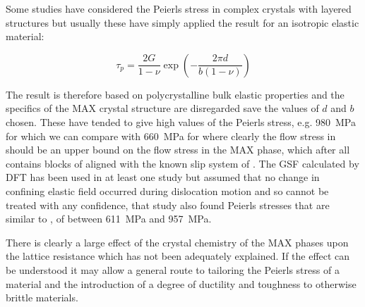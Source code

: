 Some studies have considered the Peierls stress in complex crystals with layered structures \cite{Music2008,Emmerlich2009,Gouriet2015} but usually these have simply applied the result for an isotropic elastic material:

\begin{equation}
\tau_p = \frac{2G}{1-\nu} \exp \left( - \frac{2 \pi d}{b(1-\nu)} \right)
\end{equation}

The result is therefore based on polycrystalline bulk elastic properties and the specifics of the MAX crystal structure are disregarded save the values of $d$ and $b$ chosen. These have tended to give high values of the Peierls stress, e.g. \SI{980}{\mega\pascal} for  \cite{Music2008} which we can compare with \SI{660}{\mega\pascal} for  \cite{Clegg2006} where clearly the flow stress in  should be an upper bound on the flow stress in the MAX phase, which after all contains blocks of  aligned with the known slip system of  \cite{Hollox1966}. The GSF calculated by DFT has been used in at least one study \cite{Gouriet2015} but assumed that no change in confining elastic field occurred during dislocation motion and so cannot be treated with any confidence, that study also found Peierls stresses that are similar to , of between \SI{611}{\mega\pascal} and \SI{957}{\mega\pascal}.

There is clearly a large effect of the crystal chemistry of the MAX phases upon the lattice resistance which has not been adequately explained. If the effect can be understood it may allow a general route to tailoring the Peierls stress of a material and the introduction of a degree of ductility and toughness to otherwise brittle materials.


